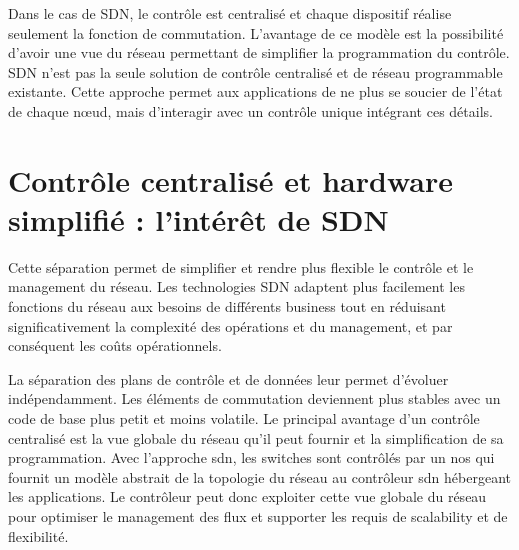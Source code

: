 Dans le cas de SDN, le contrôle est centralisé et chaque dispositif réalise seulement la fonction de commutation. L'avantage de ce modèle est la possibilité d'avoir une vue du réseau permettant de simplifier la programmation du contrôle. SDN n'est pas la seule solution de contrôle centralisé et de réseau programmable existante. Cette approche permet aux applications de ne plus se soucier de l'état de chaque nœud, mais d'interagir avec un contrôle unique intégrant ces détails. \cite{sdnbookControlDataPlanes}





\section{Contrôle centralisé et hardware simplifié : l'intérêt de SDN}



Cette séparation permet de simplifier et rendre plus flexible le contrôle et le management du réseau. Les technologies SDN adaptent plus facilement les fonctions du réseau aux besoins de différents business tout en réduisant significativement la complexité des opérations et du management, et par conséquent les coûts opérationnels. \cite{sndChineseBookConceptsApplications}


La séparation des plans de contrôle et de données leur permet d'évoluer indépendamment. Les éléments de commutation deviennent plus stables avec un code de base plus petit et moins volatile. 
Le principal avantage d'un contrôle centralisé est la vue globale du réseau qu'il peut fournir et la simplification de sa  programmation. Avec l'approche \gls{sdn}, les switches sont contrôlés par un \gls{nos} qui fournit un modèle abstrait de la topologie du réseau au contrôleur \gls{sdn} hébergeant les applications. Le contrôleur peut donc exploiter cette vue globale du réseau pour optimiser le management des flux et supporter les requis de \gls{scalability} et de flexibilité. \cite{WhySDN}

